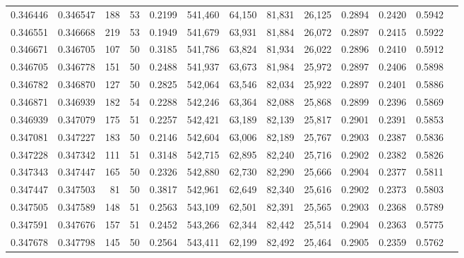 \begin{tabular}{rrrrrrrrrrrrr}
0.346446 & 0.346547 &   188 &  53 &                                     0.2199 & 541,460 &  64,150 &  81,831 &  26,125 & 0.2894 & 0.2420 & 0.5942 \\
0.346551 & 0.346668 &   219 &  53 &                                     0.1949 & 541,679 &  63,931 &  81,884 &  26,072 & 0.2897 & 0.2415 & 0.5922 \\
0.346671 & 0.346705 &   107 &  50 &                                     0.3185 & 541,786 &  63,824 &  81,934 &  26,022 & 0.2896 & 0.2410 & 0.5912 \\
0.346705 & 0.346778 &   151 &  50 &                                     0.2488 & 541,937 &  63,673 &  81,984 &  25,972 & 0.2897 & 0.2406 & 0.5898 \\
0.346782 & 0.346870 &   127 &  50 &                                     0.2825 & 542,064 &  63,546 &  82,034 &  25,922 & 0.2897 & 0.2401 & 0.5886 \\
0.346871 & 0.346939 &   182 &  54 &                                     0.2288 & 542,246 &  63,364 &  82,088 &  25,868 & 0.2899 & 0.2396 & 0.5869 \\
0.346939 & 0.347079 &   175 &  51 &                                     0.2257 & 542,421 &  63,189 &  82,139 &  25,817 & 0.2901 & 0.2391 & 0.5853 \\
0.347081 & 0.347227 &   183 &  50 &                                     0.2146 & 542,604 &  63,006 &  82,189 &  25,767 & 0.2903 & 0.2387 & 0.5836 \\
0.347228 & 0.347342 &   111 &  51 &                                     0.3148 & 542,715 &  62,895 &  82,240 &  25,716 & 0.2902 & 0.2382 & 0.5826 \\
0.347343 & 0.347447 &   165 &  50 &                                     0.2326 & 542,880 &  62,730 &  82,290 &  25,666 & 0.2904 & 0.2377 & 0.5811 \\
0.347447 & 0.347503 &    81 &  50 &                                     0.3817 & 542,961 &  62,649 &  82,340 &  25,616 & 0.2902 & 0.2373 & 0.5803 \\
0.347505 & 0.347589 &   148 &  51 &                                     0.2563 & 543,109 &  62,501 &  82,391 &  25,565 & 0.2903 & 0.2368 & 0.5789 \\
0.347591 & 0.347676 &   157 &  51 &                                     0.2452 & 543,266 &  62,344 &  82,442 &  25,514 & 0.2904 & 0.2363 & 0.5775 \\
0.347678 & 0.347798 &   145 &  50 &                                     0.2564 & 543,411 &  62,199 &  82,492 &  25,464 & 0.2905 & 0.2359 & 0.5762 \\

\end{tabular}
